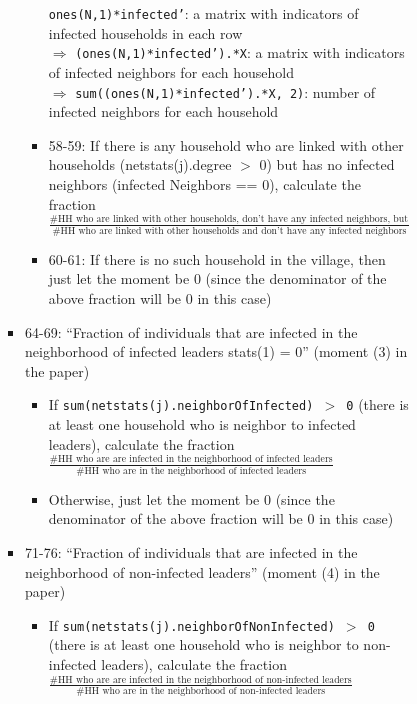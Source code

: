 \documentclass[10pt,letterpaper]{article}
\begin{document}
\begin{itemize}
\begin{itemize}
\begin{itemize}
\begin{itemize}
\begin{itemize}
\begin{itemize}
                \texttt{ones(N,1)*infected'}: a matrix with indicators of infected households in each row \\
                $\Rightarrow$ \texttt{(ones(N,1)*infected').*X}: a matrix with indicators of infected neighbors for each household \\
                $\Rightarrow$ \texttt{sum((ones(N,1)*infected').*X, 2)}: number of infected neighbors for each household
              \item 58-59: If there is any household who are linked with other households (netstats(j).degree $>$ 0) but has no infected neighbors (infected Neighbors == 0), 
                calculate the fraction $\frac{\text{\# HH who are linked with other households, don't have any infected neighbors, but are infected themselves}}{\text{\# HH who are linked with other households and don't have any infected neighbors}}$
              \item 60-61: If there is no such household in the village, then just let the moment be $0$ (since the denominator of the above fraction will be $0$ in this case)
            \end{itemize}
          \item 64-69: ``Fraction of individuals that are infected in the neighborhood of infected leaders stats(1) = 0'' (moment (3) in the paper)
            \begin{itemize}
              \item If \texttt{sum(netstats(j).neighborOfInfected) $>$ 0} (there is at least one household who is neighbor to infected leaders), calculate the fraction \\ $\frac{\text{\# HH who are are infected in the neighborhood of infected leaders}}{\text{\# HH who are in the neighborhood of infected leaders}}$
              \item Otherwise, just let the moment be $0$ (since the denominator of the above fraction will be $0$ in this case)
            \end{itemize}
          \item 71-76: ``Fraction of individuals that are infected in the neighborhood of non-infected leaders'' (moment (4) in the paper)
            \begin{itemize}
              \item If \texttt{sum(netstats(j).neighborOfNonInfected) $>$ 0} (there is at least one household who is neighbor to non-infected leaders), calculate the fraction \\ $\frac{\text{\# HH who are are infected in the neighborhood of non-infected leaders}}{\text{\# HH who are in the neighborhood of non-infected leaders}}$

\end{itemize}
\end{itemize}
\end{itemize}
\end{itemize}
\end{itemize}
\end{itemize}
\end{document}
